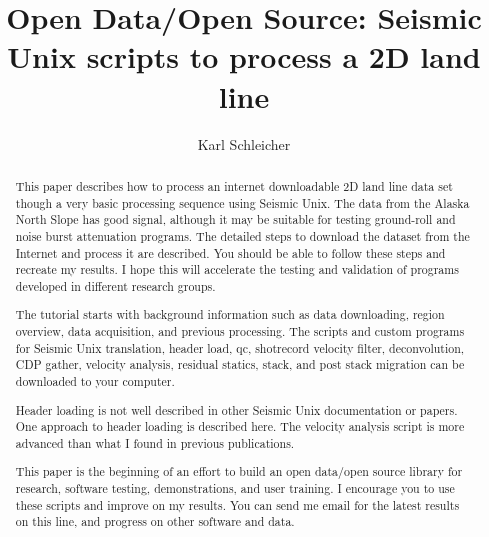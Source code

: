 
\title{Open Data/Open Source: Seismic Unix scripts to process a 2D land line}               %
\author{Karl Schleicher}

\address{
k\_schleicher@hotmail.com \\
John A. and Katherine G. Jackson School of Geosciences \\
The University of Texas at Austin \\
University Station, Box X \\
Austin, TX 78713-8924}

\maketitle

\begin{abstract}
This paper describes how to process an internet downloadable 2D land 
line data set though a very basic processing sequence using Seismic 
Unix. The data from the Alaska North Slope has good signal, 
although it may be suitable for testing ground-roll and noise burst 
attenuation programs.  The detailed steps to download the dataset from 
the Internet and process it are described.  You should be able to 
follow these steps and recreate my results.  I hope this will 
accelerate the testing and validation of programs developed in different
research groups.
\par
The tutorial starts with background information such as data downloading,
region overview, data acquisition, and previous processing.  The
scripts and custom programs for Seismic Unix translation, header load, 
qc, shotrecord velocity filter, deconvolution, CDP gather, velocity 
analysis, residual statics, stack, and post stack migration can be 
downloaded to your computer.

Header loading is not well described in other Seismic Unix documentation
or papers.  One approach to header loading is described here.  The velocity
analysis script is more advanced than what I found in previous publications.

This paper is the beginning of an effort to build an open data/open source 
library for research, software testing, demonstrations, and user training.  
I encourage you to use these scripts and improve on my results.  You can send 
me email for the latest results on this line, and progress on other software 
and data.
\end{abstract}

